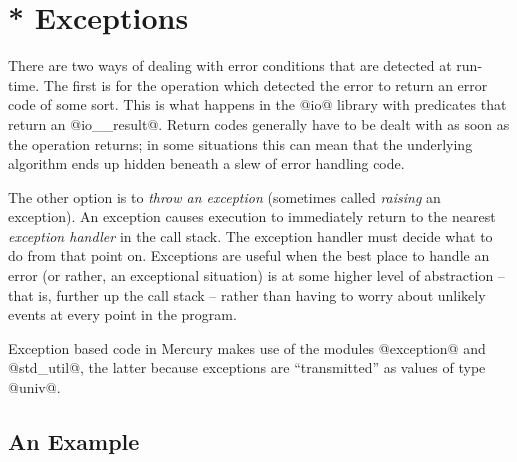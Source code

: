 
\chapter{* Exceptions}

There are two ways of dealing with error conditions that are detected at
run-time.  The first is for the operation which detected the error to
return an error code of some sort.  This is what happens in the @io@
library with predicates that return an @io__result@.  Return codes
generally have to be dealt with as soon as the operation returns; in
some situations this can mean that the underlying algorithm ends up
hidden beneath a slew of error handling code.

The other option is to \emph{throw an exception} (sometimes called
\emph{raising} an exception).  An exception causes execution to
immediately return to the nearest \emph{exception handler} in the call
stack.  The exception handler must decide what to do from that point on.
Exceptions are useful when the best place to handle an error (or rather,
an exceptional situation) is at some higher level of abstraction -- that
is, further up the call stack -- rather than having to worry about
unlikely events at every point in the program.

Exception based code in Mercury makes use of the modules @exception@ and
@std_util@, the latter because exceptions are ``transmitted'' as values
of type @univ@.

\section{An Example}


